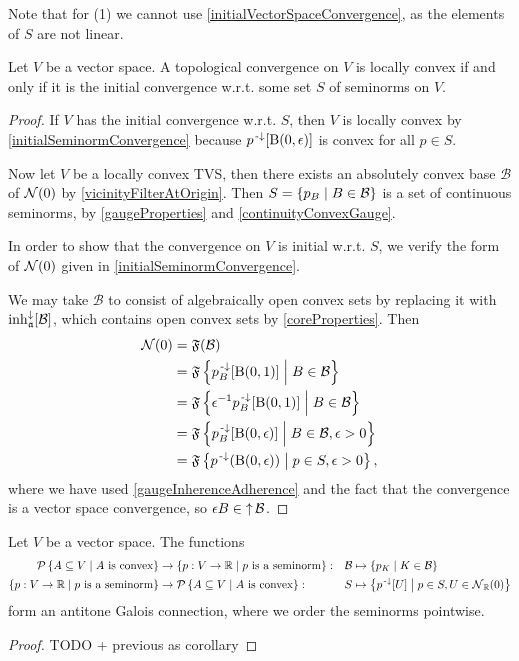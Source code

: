 Note that for (1) we cannot use \ref{initialVectorSpaceConvergence}, as the elements of $S$ are not linear.

\begin{proposition} \label{locallyConvexSeminormTopology}
Let $V$ be a vector space. A topological convergence on $V$ is locally convex \textup{if and only if} it is the initial convergence w.r.t. some set $S$ of seminorms on $V$.
\end{proposition}
\begin{proof}
If $V$ has the initial convergence w.r.t. $S$, then $V$ is locally convex by \ref{initialSeminormConvergence} because $p^{\text{\hspace{0.15em}-}\downarrow}[\operatorname{B}(0,\epsilon)]$ is convex for all $p\in S$.

Now let $V$ be a locally convex TVS, then there exists an absolutely convex base $\mathcal{B}$ of $\operatorname{\mathcal{N}}(0)$ by \ref{vicinityFilterAtOrigin}. Then $S = \left\{ p_B \;\middle|\; B\in \mathcal{B} \right\}$ is a set of continuous seminorms, by \ref{gaugeProperties} and \ref{continuityConvexGauge}.

In order to show that the convergence on $V$ is initial w.r.t. $S$, we verify the form of $\operatorname{\mathcal{N}}(0)$ given in \ref{initialSeminormConvergence}.

We may take $\mathcal{B}$ to consist of algebraically open convex sets by replacing it with $\operatorname{inh}_\mathfrak{a}^\downarrow[\mathcal{B}]$, which contains open convex sets by \ref{coreProperties}. Then
\begin{align*}
\operatorname{\mathcal{N}}(0) &= \mathfrak{F}(\mathcal{B}) \\
&= \mathfrak{F}\left\{ p_B^{\text{\hspace{0.15em}-}\downarrow}[\operatorname{B}(0,1)] \;\middle|\; B\in \mathcal{B} \right\} \\
&= \mathfrak{F}\left\{ \epsilon^{-1} p_B^{\text{\hspace{0.15em}-}\downarrow}[\operatorname{B}(0,1)] \;\middle|\; B\in \mathcal{B} \right\} \\
&= \mathfrak{F}\left\{ p_B^{\text{\hspace{0.15em}-}\downarrow}[\operatorname{B}(0,\epsilon)] \;\middle|\; B\in \mathcal{B}, \epsilon > 0 \right\} \\
&= \mathfrak{F}\left\{ p^{\text{\hspace{0.15em}-}\downarrow}(\operatorname{B}(0,\epsilon)) \;\middle|\; p\in S, \epsilon > 0 \right\},
\end{align*}
where we have used \ref{gaugeInherenceAdherence} and the fact that the convergence is a vector space convergence, so $\epsilon B \in \operatorname{\uparrow}\mathcal{B}$.
\end{proof}

\begin{proposition}
Let $V$ be a vector space. The functions
\begin{align*}
\operatorname{\mathcal{P}}\left\{ A\subseteq V \;\middle|\; \text{$A$ is convex} \right\} &\to \left\{ p: V\to \mathbb{R} \;\middle|\; \text{$p$ is a seminorm} \right\}: &&\mathcal{B}\mapsto \left\{ p_K \;\middle|\; K\in \mathcal{B} \right\} \\
\left\{ p: V\to \mathbb{R} \;\middle|\; \text{$p$ is a seminorm} \right\} &\to \operatorname{\mathcal{P}}\left\{ A\subseteq V \;\middle|\; \text{$A$ is convex} \right\}: &&S\mapsto \left\{ p^{\text{\hspace{0.15em}-}\downarrow}[U] \;\middle|\; p\in S, U\in \operatorname{\mathcal{N}}_{\mathbb{R}}(0) \right\}
\end{align*}
form an antitone Galois connection, where we order the seminorms pointwise.
\end{proposition}
\begin{proof}
TODO + previous as corollary
\end{proof}

